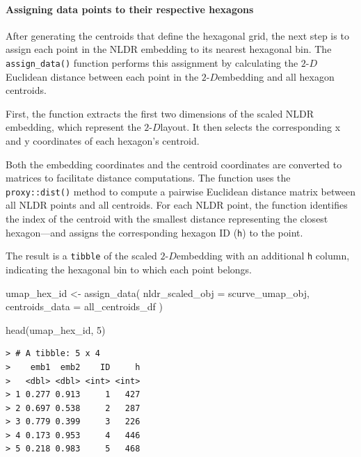 \documentclass[
  11pt,
  a4paper,
]{report}
\newenvironment{Shaded}{\begin{snugshade}}{\end{snugshade}}
\newcommand{\AttributeTok}[1]{\textcolor[rgb]{0.40,0.45,0.13}{#1}}
\newcommand{\DecValTok}[1]{\textcolor[rgb]{0.68,0.00,0.00}{#1}}
\newcommand{\FunctionTok}[1]{\textcolor[rgb]{0.28,0.35,0.67}{#1}}
\newcommand{\NormalTok}[1]{\textcolor[rgb]{0.00,0.23,0.31}{#1}}
\newcommand{\OtherTok}[1]{\textcolor[rgb]{0.00,0.23,0.31}{#1}}
\newcommand{\twoD}{$2\text{-}D$}
\begin{document}
\paragraph{Assigning data points to their respective
hexagons}\label{assigning-data-points-to-their-respective-hexagons}

After generating the centroids that define the hexagonal grid, the next
step is to assign each point in the NLDR embedding to its nearest
hexagonal bin. The \texttt{assign\_data()} function performs this
assignment by calculating the \twoD Euclidean distance between each
point in the \twoD embedding and all hexagon centroids.

First, the function extracts the first two dimensions of the scaled NLDR
embedding, which represent the \twoD layout. It then selects the
corresponding x and y coordinates of each hexagon's centroid.

Both the embedding coordinates and the centroid coordinates are
converted to matrices to facilitate distance computations. The function
uses the \texttt{proxy::dist()} method to compute a pairwise Euclidean
distance matrix between all NLDR points and all centroids. For each NLDR
point, the function identifies the index of the centroid with the
smallest distance representing the closest hexagon---and assigns the
corresponding hexagon ID (\texttt{h}) to the point.

The result is a \texttt{tibble} of the scaled \twoD embedding with an
additional \texttt{h} column, indicating the hexagonal bin to which each
point belongs.

\begin{Shaded}
\begin{Highlighting}[]
\NormalTok{umap\_hex\_id }\OtherTok{\textless{}{-}} \FunctionTok{assign\_data}\NormalTok{(}
  \AttributeTok{nldr\_scaled\_obj =}\NormalTok{ scurve\_umap\_obj, }
  \AttributeTok{centroids\_data =}\NormalTok{ all\_centroids\_df}
\NormalTok{  )}

\FunctionTok{head}\NormalTok{(umap\_hex\_id, }\DecValTok{5}\NormalTok{)}
\end{Highlighting}
\end{Shaded}

\begin{verbatim}
> # A tibble: 5 x 4
>    emb1  emb2    ID     h
>   <dbl> <dbl> <int> <int>
> 1 0.277 0.913     1   427
> 2 0.697 0.538     2   287
> 3 0.779 0.399     3   226
> 4 0.173 0.953     4   446
> 5 0.218 0.983     5   468
\end{verbatim}
\end{document}
